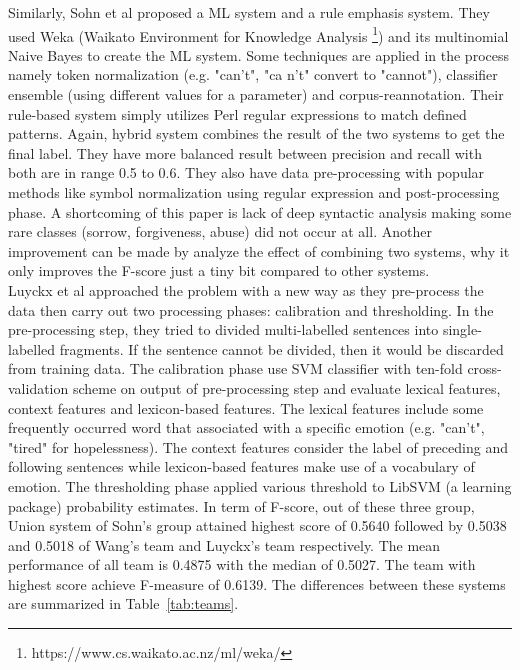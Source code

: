 Similarly, Sohn et al \cite{Sohn2012} proposed a ML system and a rule emphasis system. They used Weka (Waikato Environment for Knowledge Analysis \footnote{https://www.cs.waikato.ac.nz/ml/weka/}) and its multinomial Naive Bayes to create the ML system. Some techniques are applied in the process namely token normalization (e.g. "can’t", "ca n’t" convert to "cannot"), classifier ensemble (using different values for a parameter) and corpus-reannotation. Their rule-based system simply utilizes Perl regular expressions to match defined patterns. Again, hybrid system combines the result of the two systems to get the final label. They have more balanced result between precision and recall with both are in range 0.5 to 0.6. They also have data pre-processing with popular methods like symbol normalization using regular expression and post-processing phase. A shortcoming of this paper is lack of deep syntactic analysis making some rare classes (sorrow, forgiveness, abuse) did not occur at all. Another improvement can be made by analyze the effect of combining two systems, why it only improves the F-score just a tiny bit compared to other systems.\\

Luyckx et al \cite{Luyckx2012} approached the problem with a new way as they pre-process the data then carry out two processing phases: calibration and thresholding. In the pre-processing step, they tried to divided multi-labelled sentences into single-labelled fragments. If the sentence cannot be divided, then it would be discarded from training data. The calibration phase use SVM classifier with ten-fold cross-validation scheme on output of pre-processing step and evaluate lexical features, context features and lexicon-based features. The lexical features include some frequently occurred word that associated with a specific emotion (e.g. "can’t", "tired" for hopelessness). The context features consider the label of preceding and following sentences while lexicon-based features make use of a vocabulary of emotion. The thresholding phase applied various threshold to LibSVM (a learning package) probability estimates. In term of F-score, out of these three group, Union system of Sohn’s group attained highest score of 0.5640 followed by 0.5038 and 0.5018 of Wang’s team and Luyckx’s team respectively. The mean performance of all team is 0.4875 with the median of 0.5027. The team with highest score achieve F-measure of 0.6139. The differences between these systems are summarized in Table~\ref{tab:teams}.\\

